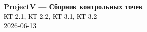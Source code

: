 \documentclass[11pt,a4paper,oneside]{article}
\begin{document}
\thispagestyle{plain}
\begin{center}
  {\Huge\bfseries ProjectV — Сборник контрольных точек}\\[12pt]
  {\Large КТ-2.1, КТ-2.2, КТ-3.1, КТ-3.2}\\[6pt]
  {\large 2026-06-13}
\end{center}
\vspace{1cm}
\tableofcontents
\clearpage

\clearpage


\clearpage


\clearpage


\clearpage

\end{document}
